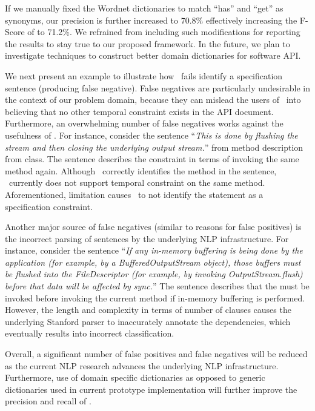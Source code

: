 If we manually fixed the Wordnet dictionaries to match ``has'' and ``get'' as synonyms, our precision is further increased to 70.8\% effectively increasing the F-Score of \tool to 71.2\%. We refrained from including such modifications for reporting the results to stay true to our proposed framework. In the future, we plan to investigate techniques to construct better domain dictionaries for software API.

We next present an example to illustrate how \tool\ fails identify a specification sentence (producing false negative). False negatives are particularly undesirable in the context of our problem domain, because they can mislead the users of \tool\ into believing that no other temporal constraint exists in the API document. Furthermore, an overwhelming number of false negatives works against the usefulness of \tool. For instance, consider the sentence ``\textit{This is done by flushing the stream and then closing the underlying output stream.}'' from   method description from  class. The sentence describes the constraint in terms of invoking the same method again. Although \tool\ correctly identifies the method  in the sentence, \tool\ currently does not support temporal constraint on the same method. Aforementioned, limitation causes \tool\ to not identify the statement as a specification constraint.   


Another major source of false negatives (similar to reasons for false positives) is the incorrect parsing of sentences by the underlying NLP infrastructure. For instance, consider the sentence ``\textit{If any in-memory buffering is being done by the application (for example, by a BufferedOutputStream object), those buffers must be flushed into the FileDescriptor (for example, by invoking OutputStream.flush) before that data will be affected by sync.}'' The sentence describes that the  must be invoked before invoking the current method if in-memory buffering is performed. However, the length and complexity in terms of number of clauses causes the underlying Stanford parser to inaccurately annotate the dependencies, which eventually results into incorrect classification. 

Overall, a significant number of false positives and false negatives will be reduced as the current NLP research advances the underlying NLP infrastructure. Furthermore, use of domain specific dictionaries as opposed to generic dictionaries used in current prototype implementation will further improve the precision and recall of \tool. 

